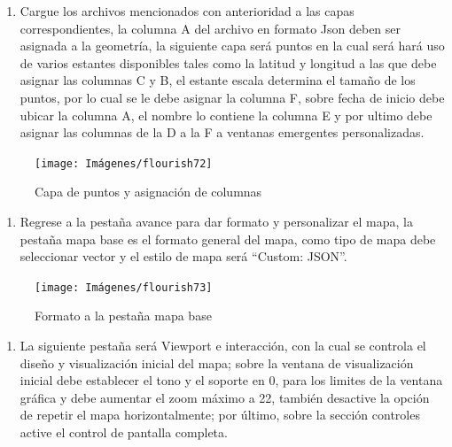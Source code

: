 \documentclass[
]{book}
\providecommand{\tightlist}{%
  \setlength{\itemsep}{0pt}\setlength{\parskip}{0pt}}
\begin{document}
\begin{enumerate}
\def\labelenumi{\arabic{enumi}.}
\setcounter{enumi}{1}
\tightlist
\item
  Cargue los archivos mencionados con anterioridad a las capas correspondientes, la columna A del archivo en formato Json deben ser asignada a la geometría, la siguiente capa será puntos en la cual será hará uso de varios estantes disponibles tales como la latitud y longitud a las que debe asignar las columnas C y B, el estante escala determina el tamaño de los puntos, por lo cual se le debe asignar la columna F, sobre fecha de inicio debe ubicar la columna A, el nombre lo contiene la columna E y por ultimo debe asignar las columnas de la D a la F a ventanas emergentes personalizadas.
\end{enumerate}

\begin{figure}

{\centering \texttt{[image: Imágenes/flourish72]} 

}

\caption{Capa de puntos y asignación de columnas}\label{fig:paso2mapa3dflourish-fig}
\end{figure}

\begin{enumerate}
\def\labelenumi{\arabic{enumi}.}
\setcounter{enumi}{2}
\tightlist
\item
  Regrese a la pestaña avance para dar formato y personalizar el mapa, la pestaña mapa base es el formato general del mapa, como tipo de mapa debe seleccionar vector y el estilo de mapa será ``Custom: JSON''.
\end{enumerate}

\begin{figure}

{\centering \texttt{[image: Imágenes/flourish73]} 

}

\caption{Formato a la pestaña mapa base}\label{fig:paso3mapa3dflourish-fig}
\end{figure}

\begin{enumerate}
\def\labelenumi{\arabic{enumi}.}
\setcounter{enumi}{3}
\tightlist
\item
  La siguiente pestaña será Viewport e interacción, con la cual se controla el diseño y visualización inicial del mapa; sobre la ventana de visualización inicial debe establecer el tono y el soporte en 0, para los limites de la ventana gráfica y debe aumentar el zoom máximo a 22, también desactive la opción de repetir el mapa horizontalmente; por último, sobre la sección controles active el control de pantalla completa.
\end{enumerate}
\end{document}

